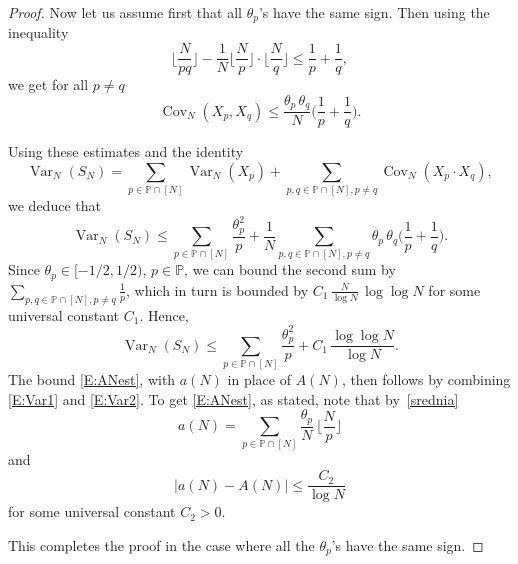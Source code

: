 \documentclass[11pt]{amsart}
\theoremstyle{definition}
\renewcommand{\P}{{\mathbb P}}
\newcommand{\Var}{\operatorname{Var}}
\newcommand{\Cov}{\operatorname{Cov}}
\begin{document}
\begin{proof}
	Now let us assume first  that all $\theta_p$'s have the same sign. Then using the inequality
	$$
	\Big\lfloor\frac{N}{pq}\Big\rfloor - \frac{1}{N}\Big\lfloor\frac{N}{p}\Big\rfloor \cdot \Big\lfloor\frac{N}{q}\Big\rfloor \leq \frac{1}{p}+\frac{1}{q},
	$$
	we get for all $p\neq q$
	$$
	\Cov_N(X_p,X_q) \leq \frac{\theta_p\, \theta_q}{N}\Big(\frac{1}{p}+\frac{1}{q}\Big).
	$$
	
	Using these estimates and the identity
	$$
	\Var_N(S_N)=\sum_{p\in \P\cap[N]} \Var_N(X_p)+\sum_{p,q\in \P\cap [N], p\neq q} \Cov_N(X_p\cdot X_q),
	$$
	we deduce that
	$$
	\Var_N(S_N)\leq  \sum_{p\in \P\cap[N]} \frac{\theta_p^2}{p}+
	\frac{1}{N}\sum_{p,q\in \P\cap [N], p\neq q} \theta_p\, \theta_q\Big(\frac{1}{p}+\frac{1}{q}\Big).
	$$
	Since $\theta_p\in [-1/2,1/2)$, $p\in \P$, we can bound the second sum by $\sum_{p,q\in \P\cap [N], p\neq q}\frac{1}{p}$, which in turn is bounded by $C_1 \, \frac{N}{\log{N}}\,  \log\log{N}$ for some universal constant $C_1$. Hence,
	\begin{equation}\label{E:Var2}
		\Var_N(S_N)\leq  \sum_{p\in \P\cap[N]} \frac{\theta_p^2}{p}+C_1\, \frac{\log\log{N}}{\log{N}}.
	\end{equation}
	The bound \eqref{E:ANest}, with $a(N)$  in place of $A(N)$,  then follows by combining \eqref{E:Var1} and  \eqref{E:Var2}.
	To get  \eqref{E:ANest}, as stated,  note that by~\eqref{srednia}
$$
		a(N)=\sum_{p\in \P\cap [N]}  \frac{\theta_p}{N}\, \Big\lfloor\frac{N}{p}\Big\rfloor
$$
	and
	$$
	|a(N)-A(N)|\leq \frac{C_2}{\log{N}}
	$$
	for some universal constant $C_2>0$.
	
	This completes the proof in the case where all the $\theta_p$'s have the same sign.
	

\end{proof}
\end{document}
